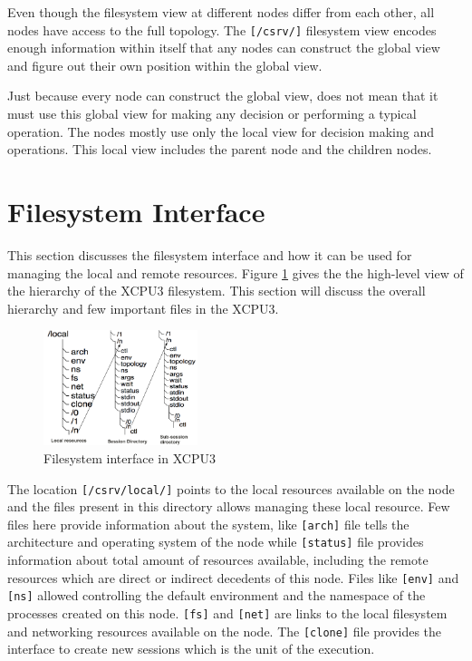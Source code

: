\documentclass{sig-alternate}
\begin{document}
Even though the filesystem view at different nodes differ from each other, 
all nodes have access to the full topology.  The \texttt{[/csrv/]} filesystem
view encodes enough information within itself that any nodes can construct the
global view and figure out their own position within the global view.

Just because every node can construct the global view, does not mean that it
must use this global view for making any decision or performing a typical
operation. The nodes mostly use only the local view for decision making and
operations. This local view includes the parent node and the children nodes.


\section{Filesystem Interface}

This section discusses the filesystem interface and how it can be used for
managing the local and remote resources. Figure \ref{fig:xcpu3Local} gives the
the high-level view of the hierarchy of the XCPU3 filesystem.  This section
will discuss the overall hierarchy and few important files in the XCPU3.

\begin{figure}[h]
  \begin{center}
    \leavevmode
      \includegraphics[height=0.25\textheight,width=0.4\textwidth]
		{./img/local_session_subsessions}
    \caption{Filesystem interface in XCPU3}
    \label{fig:xcpu3Local}
  \end{center}
\end{figure}

The location \texttt{[/csrv/local/]} points to the local resources available on
the node and the files present in this directory allows managing these local
resource. Few files here provide information about the system, like
\texttt{[arch]} file tells the architecture and operating system of the node
while \texttt{[status]} file provides information about total amount of
resources available, including the remote resources which are direct or
indirect decedents of this node.  Files like \texttt{[env]} and \texttt{[ns]}
allowed controlling the default environment and the namespace of the processes
created on this node.  \texttt{[fs]} and \texttt{[net]} are links to the local
filesystem and networking resources available on the node.  The
\texttt{[clone]} file provides the interface to create new sessions which is
the unit of the execution.
\end{document}

